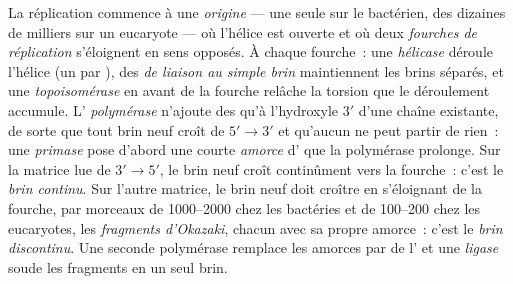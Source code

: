 \begin{definition}\label{def:b1:replication-mitosis:fork}
La réplication commence à une \emph{origine} --- une seule sur le
 bactérien, des dizaines de milliers sur un  eucaryote
--- où l'hélice est ouverte et où deux \emph{fourches de réplication}
s'éloignent en sens opposés. À chaque fourche~: une \emph{hélicase}
déroule l'hélice (un  par ), des \emph{ de
liaison au simple brin} maintiennent les brins séparés, et une
\emph{topoisomérase} en avant de la fourche relâche la torsion que le
déroulement accumule. L'\emph{ polymérase} n'ajoute des 
qu'à l'hydroxyle $3'$ d'une chaîne existante, de sorte que tout brin
neuf croît de $5' \to 3'$ et qu'aucun ne peut partir de rien~: une
\emph{primase} pose d'abord une courte \emph{amorce} d' que la
polymérase prolonge. Sur la matrice lue de $3' \to 5'$, le brin neuf
croît continûment vers la fourche~: c'est le \emph{brin continu}. Sur
l'autre matrice, le brin neuf doit croître en s'éloignant de la fourche,
par morceaux de \qtyrange{1000}{2000}{}  chez les bactéries
et de \qtyrange{100}{200}{} chez les eucaryotes, les \emph{fragments
d'Okazaki}, chacun avec sa propre amorce~: c'est le \emph{brin
discontinu}. Une seconde polymérase remplace les amorces par de l' et
une \emph{ligase} soude les fragments en un seul brin.
\end{definition}

